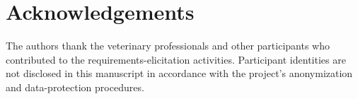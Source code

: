 \documentclass[pdflatex,sn-mathphys-num,Numbered]{sn-jnl}
\begin{document}
\section*{Acknowledgements}
The authors thank the veterinary professionals and other participants who contributed to the requirements-elicitation activities. Participant identities are not disclosed in this manuscript in accordance with the project's anonymization and data-protection procedures.




\end{document}
